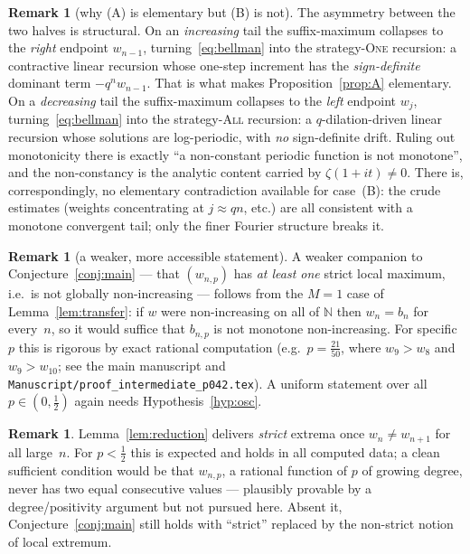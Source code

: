 \documentclass[11pt]{article}
\theoremstyle{definition}
\newtheorem{remark}[theorem]{Remark}
\newcommand{\One}{\textsc{One}}
\newcommand{\All}{\textsc{All}}
\newcommand{\N}{\mathbb{N}}
\begin{document}
\begin{remark}[why (A) is elementary but (B) is not]
  The asymmetry between the two halves is structural. On an
  \emph{increasing} tail the suffix-maximum collapses to the
  \emph{right} endpoint $w_{n-1}$, turning~\eqref{eq:bellman} into the
  strategy-\One{} recursion: a contractive linear recursion whose
  one-step increment has the \emph{sign-definite} dominant term
  $-q^n w_{n-1}$. That is what makes Proposition~\ref{prop:A}
  elementary. On a \emph{decreasing} tail the suffix-maximum collapses
  to the \emph{left} endpoint $w_j$, turning~\eqref{eq:bellman} into
  the strategy-\All{} recursion: a $q$-dilation-driven linear
  recursion whose solutions are log-periodic, with \emph{no}
  sign-definite drift. Ruling out monotonicity there is exactly
  ``a non-constant periodic function is not monotone'', and the
  non-constancy is the analytic content carried by
  $\zeta(1+it)\ne 0$. There is, correspondingly, no elementary
  contradiction available for case~(B): the crude estimates (weights
  concentrating at $j\approx qn$, etc.) are all consistent with a
  monotone convergent tail; only the finer Fourier structure breaks it.
\end{remark}

\begin{remark}[a weaker, more accessible statement]
  A weaker companion to Conjecture~\ref{conj:main} --- that
  $(w_{n,p})$ has \emph{at least one} strict local maximum, i.e.\ is
  not globally non-increasing --- follows from the $M=1$ case of
  Lemma~\ref{lem:transfer}: if $w$ were non-increasing on all of $\N$
  then $w_n=b_n$ for every~$n$, so it would suffice that $b_{n,p}$ is
  not monotone non-increasing. For specific $p$ this is rigorous by
  exact rational computation (e.g.\ $p=\tfrac{21}{50}$, where
  $w_9>w_8$ and $w_9>w_{10}$; see the main manuscript and
  \texttt{Manuscript/proof\_intermediate\_p042.tex}). A uniform
  statement over all $p\in(0,\tfrac12)$ again needs
  Hypothesis~\ref{hyp:osc}.
\end{remark}

\begin{remark}\label{rem:strictness}
  Lemma~\ref{lem:reduction} delivers \emph{strict} extrema once
  $w_n\ne w_{n+1}$ for all large~$n$. For $p<\tfrac12$ this is expected
  and holds in all computed data; a clean sufficient condition would
  be that $w_{n,p}$, a rational function of $p$ of growing degree,
  never has two equal consecutive values --- plausibly provable by a
  degree/positivity argument but not pursued here. Absent it,
  Conjecture~\ref{conj:main} still holds with ``strict'' replaced by
  the non-strict notion of local extremum.
\end{remark}
\end{document}
